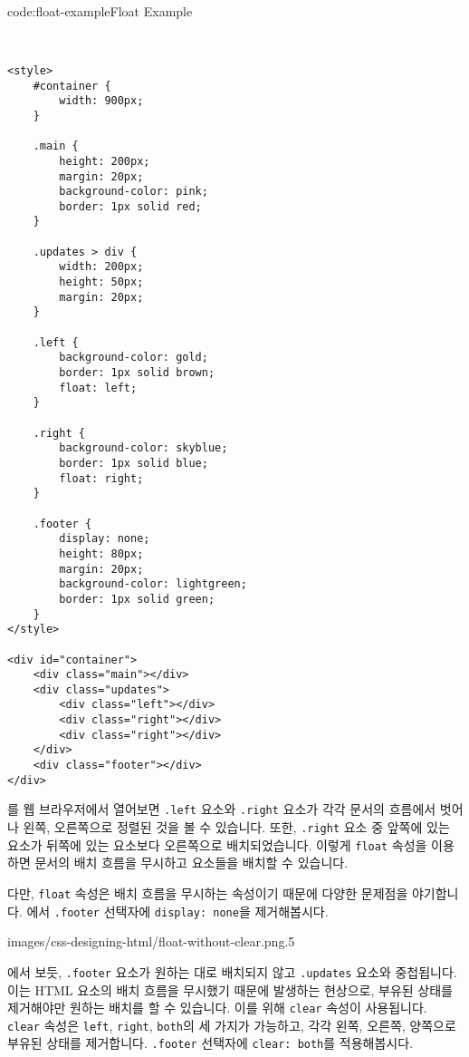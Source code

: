 \begin{codeenv}{code:float-example}{Float Example}\begin{verbatim}


<style>
    #container {
        width: 900px;
    }

    .main {
        height: 200px;
        margin: 20px;
        background-color: pink;
        border: 1px solid red;
    }

    .updates > div {
        width: 200px;
        height: 50px;
        margin: 20px;
    }

    .left {
        background-color: gold;
        border: 1px solid brown;
        float: left;
    }

    .right {
        background-color: skyblue;
        border: 1px solid blue;
        float: right;
    }

    .footer {
        display: none;
        height: 80px;
        margin: 20px;
        background-color: lightgreen;
        border: 1px solid green;
    }
</style>

<div id="container">
    <div class="main"></div>
    <div class="updates">
        <div class="left"></div>
        <div class="right"></div>
        <div class="right"></div>
    </div>
    <div class="footer"></div>
</div>
\end{verbatim}
\end{codeenv}

를 웹 브라우저에서 열어보면 \verb|.left| 요소와 \verb|.right| 요소가 각각 문서의 흐름에서 벗어나 왼쪽, 오른쪽으로 정렬된 것을 볼 수 있습니다. 또한, \verb|.right| 요소 중 앞쪽에 있는 요소가 뒤쪽에 있는 요소보다 오른쪽으로 배치되었습니다. 이렇게 \verb|float| 속성을 이용하면 문서의 배치 흐름을 무시하고 요소들을 배치할 수 있습니다.

다만, \verb|float| 속성은 배치 흐름을 무시하는 속성이기 때문에 다양한 문제점을 야기합니다. 에서 \verb|.footer| 선택자에 \verb|display: none|을 제거해봅시다.

    {images/css-designing-html/float-without-clear.png}{.5}

에서 보듯, \verb|.footer| 요소가 원하는 대로 배치되지 않고 \verb|.updates| 요소와 중첩됩니다. 이는 HTML 요소의 배치 흐름을 무시했기 때문에 발생하는 현상으로, 부유된 상태를 제거해야만 원하는 배치를 할 수 있습니다. 이를 위해 \verb|clear| 속성이 사용됩니다. \verb|clear| 속성은 \verb|left|, \verb|right|, \verb|both|의 세 가지가 가능하고, 각각 왼쪽, 오른쪽, 양쪽으로 부유된 상태를 제거합니다. \verb|.footer| 선택자에 \verb|clear: both|를 적용해봅시다.

